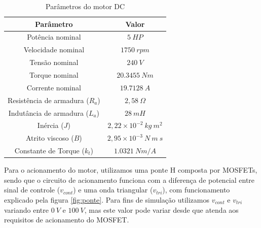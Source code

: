\documentclass{article}
\begin{document}
\begin{table}[]
	\centering
	\caption{Parâmetros do motor DC}
	\label{tab:param}
	\begin{tabular}{|c|c|}
		\hline
		\textbf{Parâmetro}              & \textbf{Valor}                 \\ \hline
		Potência nominal                & $5\ HP$                        \\ \hline
		Velocidade nominal              & $1750\ rpm$                    \\ \hline
		Tensão nominal                  & $240\ V$                       \\ \hline
		Torque nominal					& $20.3455\ Nm$ \\ \hline
		Corrente nominal				& $19.7128\ A$ \\ \hline
		Resistência de armadura ($R_a$) & $2,58\ \Omega$                 \\ \hline
		Indutância de armadura ($L_a$)  & $28\ mH$                       \\ \hline
		Inércia ($J$)                   & $2,22 \times 10^{-2}\ kg\ m^2$ \\ \hline
		Atrito viscoso ($B$)            & $2,95 \times 10^{-3}\ N\ m\ s$ \\ \hline
		Constante de Torque ($k_t$)		& $1.0321\ Nm/A$ \\ \hline
	\end{tabular}
\end{table}

Para o acionamento do motor, utilizamos uma ponte H composta por MOSFETs, sendo que o circuito de acionamento funciona com a diferença de potencial entre sinal de controle ($v_{cont}$) e uma onda triangular ($v_{tri}$), com funcionamento explicado pela figura \ref{fig:ponte}. Para fins de simulação utilizamos $v_{cont}$ e $v_{tri}$ variando entre $0\ V$ e $100\ V$, mas este valor pode variar desde que atenda aos requisitos de acionamento do MOSFET.
\end{document}

